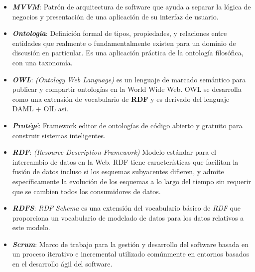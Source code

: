 \begin{itemize}
    \item \textbf{\textit{MVVM}}: Patrón de arquitectura de software que
    ayuda a separar la lógica de negocios y presentación de una aplicación 
    de su interfaz de usuario. 

    \item \textbf{\textit{Ontología}}:  Definición formal de tipos, propiedades, 
    y relaciones entre entidades que realmente o fundamentalmente existen 
    para un dominio de discusión en particular. Es una aplicación práctica 
    de la ontología filosófica, con una taxonomía.

    \item \textbf{\textit{OWL}}: \emph{(Ontology Web Language)} es un lenguaje 
    de marcado semántico para publicar y compartir ontologías en la 
    World Wide Web. OWL se desarrolla como una extensión de vocabulario 
    de \textbf{RDF} y es derivado del lenguaje DAML + OIL asi.


    \item \textbf{\textit{Protégé}}: Framework editor de ontologías de 
    código abierto y gratuito para construir sistemas inteligentes.

    \item \textbf{\textit{RDF}}: \emph{(Resource Description Framework)} 
    Modelo estándar para el intercambio de datos en la Web. RDF 
    tiene características que facilitan la fusión de datos incluso si 
    los esquemas subyacentes difieren, y admite específicamente la 
    evolución de los esquemas a lo largo del tiempo sin requerir que 
    se cambien todos los consumidores de datos.

    \item \textbf{\textit{RDFS}}: \emph{RDF Schema} es una 
    extensión del vocabulario básico de \emph{RDF} que proporciona un 
    vocabulario de modelado de datos para los datos relativos a este modelo.

    \item \textbf{\textit{Scrum}}: Marco de trabajo para la gestión y 
    desarrollo del software basada en un proceso iterativo e incremental 
    utilizado comúnmente en entornos basados en el desarrollo ágil del
    software.
    

\end{itemize}
